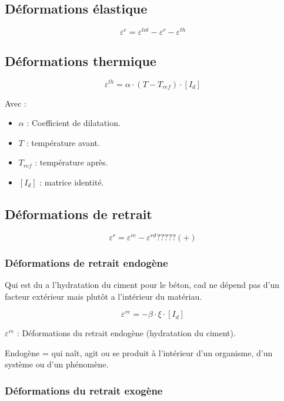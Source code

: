 \documentclass[12pt,a4paper]{report}
\begin{document}
	
	
	
	\subsection{Déformations élastique}
		
		
	\[ \varepsilon^{e} = \varepsilon^{tot} - \varepsilon^{r} - \varepsilon^{th} \]
		
		
	
	\subsection{Déformations thermique}
	
	\[ \varepsilon^{th} = \alpha \cdot (T - T_{ref}) \cdot [I_{d}] \]
	
	Avec : 
	
	\begin{itemize}
		\item $\alpha$ : Coefficient de dilatation.
		\item $T$ : température avant.
		\item $T_{ref}$ : température après.
		\item $[I_{d}]$ : matrice identité.
	\end{itemize}
	
	
	\subsection{Déformations de retrait}
	
	
	\[ \varepsilon^{r} = \varepsilon^{re} - \varepsilon^{rd}?????( + ) \]
	
	
	
	\subsubsection{Déformations de retrait endogène}
	
	Qui est du a l'hydratation du ciment pour le béton, cad ne dépend pas d'un facteur extérieur mais plutôt a l'intérieur du matériau.
	
	\[ \varepsilon^{re} =  - \beta \cdot \xi \cdot [I_{d}] \]
	
	$\varepsilon^{re}$ : Déformations du retrait endogène (hydratation du ciment).
	
	Endogène = qui naît, agit ou se produit à l’intérieur d’un organisme, d’un système ou d’un phénomène.
	
	
	
	
	\subsubsection{Déformations du retrait exogène}
	
\end{document}
